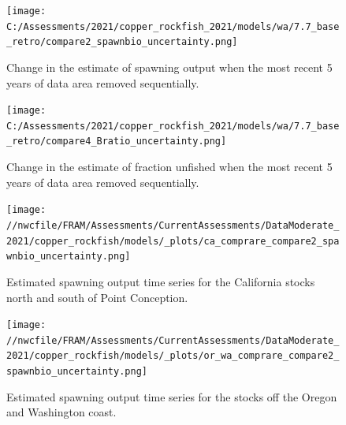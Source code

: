 \documentclass[11pt,
  english,
  a4paper,
]{article}
\begin{document}
\tagmcend\tagstructend

\newpage


\begin{figure}
\centering
\texttt{[image: C:/Assessments/2021/copper\_rockfish\_2021/models/wa/7.7\_base\_retro/compare2\_spawnbio\_uncertainty.png]}
\caption{Change in the estimate of spawning output when the most recent 5 years of data area removed sequentially.\label{fig:retro-ssb}}
\end{figure}

\tagmcend\tagstructend


\begin{figure}
\centering
\texttt{[image: C:/Assessments/2021/copper\_rockfish\_2021/models/wa/7.7\_base\_retro/compare4\_Bratio\_uncertainty.png]}
\caption{Change in the estimate of fraction unfished when the most recent 5 years of data area removed sequentially.\label{fig:retro-depl}}
\end{figure}

\tagmcend\tagstructend

\newpage


\begin{figure}
\centering
\texttt{[image: //nwcfile/FRAM/Assessments/CurrentAssessments/DataModerate\_2021/copper\_rockfish/models/\_plots/ca\_comprare\_compare2\_spawnbio\_uncertainty.png]}
\caption{Estimated spawning output time series for the California stocks north and south of Point Conception.\label{fig:ssb-ca-compare}}
\end{figure}

\tagmcend\tagstructend


\begin{figure}
\centering
\texttt{[image: //nwcfile/FRAM/Assessments/CurrentAssessments/DataModerate\_2021/copper\_rockfish/models/\_plots/or\_wa\_comprare\_compare2\_spawnbio\_uncertainty.png]}
\caption{Estimated spawning output time series for the stocks off the Oregon and Washington coast.\label{fig:ssb-orwa-compare}}
\end{figure}
\end{document}
